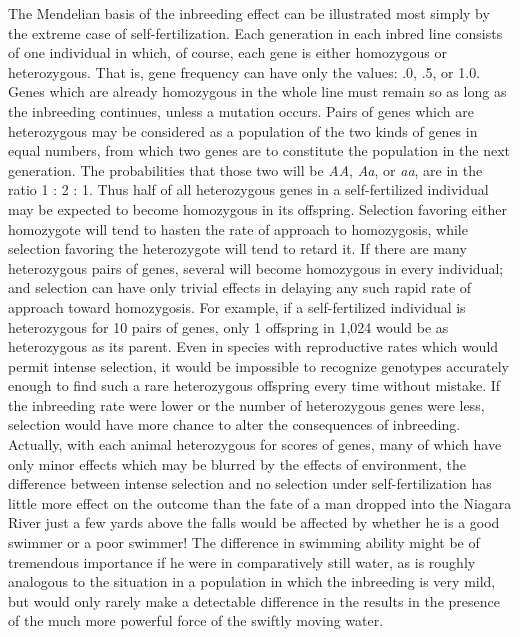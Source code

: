 The Mendelian basis of the inbreeding effect can be illustrated most
simply by the extreme case of self-fertilization. Each generation in each
inbred line consists of one individual in which, of course, each gene is
either homozygous or heterozygous. That is, gene frequency can have
only the values: .0, .5, or 1.0. Genes which are already homozygous in
the whole line must remain so as long as the inbreeding continues,
unless a mutation occurs. Pairs of genes which are heterozygous may be
considered as a population of the two kinds of genes in equal numbers,
from which two genes are to constitute the population in the next generation.
The probabilities that those two will be \textit{AA}, \textit{Aa}, or \textit{aa}, are in
the ratio 1 : 2 : 1. Thus half of all heterozygous genes in a self-fertilized
individual may be expected to become homozygous in its offspring.
Selection favoring either homozygote will tend to hasten the rate of
approach to homozygosis, while selection favoring the heterozygote will
tend to retard it. If there are many heterozygous pairs of genes, several
will become homozygous in every individual; and selection can have
only trivial effects in delaying any such rapid rate of approach toward
homozygosis. For example, if a self-fertilized individual is heterozygous
for 10 pairs of genes, only 1 offspring in 1,024 would be as heterozygous
as its parent. Even in species with reproductive rates which would permit
intense selection, it would be impossible to recognize genotypes
accurately enough to find such a rare heterozygous offspring every time
without mistake. If the inbreeding rate were lower or the number of
heterozygous genes were less, selection would have more chance to alter
the consequences of inbreeding. Actually, with each animal heterozygous
for scores of genes, many of which have only minor effects which
may be blurred by the effects of environment, the difference between
intense selection and no selection under self-fertilization has little more
effect on the outcome than the fate of a man dropped into the Niagara
River just a few yards above the falls would be affected by whether he is
a good swimmer or a poor swimmer! The difference in swimming ability
might be of tremendous importance if he were in comparatively
still water, as is roughly analogous to the situation in a population in
which the inbreeding is very mild, but would only rarely make a detectable
difference in the results in the presence of the much more powerful
force of the swiftly moving water.
\noclub[3]


